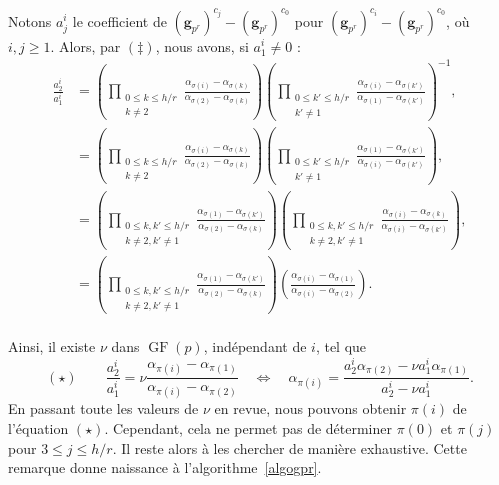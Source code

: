\documentclass[a4paper, titlepage, 11pt]{article}
\theoremstyle{definition}
\theoremstyle{remark}
\def\gf{\operatorname{GF}}
\def\mbf#1{\mathbf{#1}}
\begin{document}
Notons $a_j^i$ le coefficient de $(\mbf g_{p^r})^{c_{{j}}} - (\mbf g_{p^r})^{c_{0}}$ pour $(\mbf g_{p^r})^{c_{i}} - (\mbf g_{p^r})^{c_{0}}$, où $i , j\geqslant 1$. Alors, par $(\ddagger)$, nous avons, si $a_1^i \neq 0$ :
\begin{align*}
\frac{a_2^i}{a_1^i} &= \left(\prod_{\substack{0\leqslant k\leqslant h/r \\ k \neq 2}} \frac{\alpha_{\sigma(i)}-\alpha_{\sigma(k)}}{\alpha_{\sigma(2)}-\alpha_{\sigma(k)}} \right)\left(\prod_{\substack{0\leqslant k'\leqslant h/r \\ k' \neq 1}} \frac{\alpha_{\sigma(i)}-\alpha_{\sigma({k'})}}{\alpha_{\sigma(1)}-\alpha_{\sigma({k'})}} \right)^{-1}, \\
&= \left(\prod_{\substack{0\leqslant k\leqslant h/r \\ k \neq 2}} \frac{\alpha_{\sigma(i)}-\alpha_{\sigma(k)}}{\alpha_{\sigma(2)}-\alpha_{\sigma(k)}} \right)\left(\prod_{\substack{0\leqslant k' \leqslant h/r \\ k' \neq 1}} \frac{\alpha_{\sigma(1)}-\alpha_{\sigma({k'})}}{\alpha_{\sigma(i)}-\alpha_{\sigma({k'})}} \right), \\
&= \left(\prod_{\substack{0\leqslant k, k'\leqslant h/r \\ k \neq 2, k' \neq 1}} \frac{\alpha_{\sigma(1)}-\alpha_{\sigma({k'})}}{\alpha_{\sigma(2)}-\alpha_{\sigma(k)}} \right) \left(\prod_{\substack{0\leqslant k, k'\leqslant h/r \\ k \neq 2, k' \neq 1}} \frac{\alpha_{\sigma(i)}-\alpha_{\sigma(k)}}{\alpha_{\sigma(i)}-\alpha_{\sigma({k'})}} \right), \\
&= \left(\prod_{\substack{0\leqslant k, k'\leqslant h/r \\ k \neq 2, k' \neq 1}} \frac{\alpha_{\sigma(1)}-\alpha_{\sigma({k'})}}{\alpha_{\sigma(2)}-\alpha_{\sigma(k)}} \right) \left(\frac{\alpha_{\sigma(i)}-\alpha_{\sigma(1)}}{\alpha_{\sigma(i)}-\alpha_{\sigma(2)}} \right). \\
\end{align*}

Ainsi, il existe $\nu$ dans $\gf(p)$, indépendant de $i$, tel que 
$$(\star) \qquad\frac{a_2^i}{a_1^i} = \nu \frac{\alpha_{\pi(i)}-\alpha_{\pi(1)}}{\alpha_{\pi(i)}-\alpha_{\pi(2)}}\quad\Leftrightarrow\quad
\alpha_{\pi(i)} = \frac{a_2^i\alpha_{\pi(2)}-\nu a_1^i\alpha_{\pi(1)}}{a_2^i-\nu a_1^i}.$$
En passant toute les valeurs de $\nu$ en revue, nous pouvons obtenir $\pi(i)$ de l'équation $(\star)$. Cependant, cela ne permet pas de déterminer $\pi(0)$ et $\pi(j)$ pour $3 \leqslant j \leqslant h/r$. Il reste alors à les chercher de manière exhaustive. Cette remarque donne naissance à l'algorithme~\ref{algogpr}.
\end{document}
